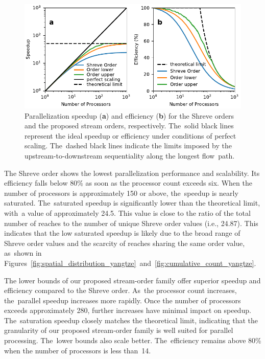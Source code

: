 \documentclass[water,article,accept,pdftex,moreauthors]{Definitions/mdpi}
\begin{document}
\vspace{-6pt}
\begin{figure}[H]
    \includegraphics[width=13.5cm]{fig/speedup_yangtze.pdf}
    \caption{Parallelization speedup (\textbf{a}) and efficiency (\textbf{b}) for the Shreve orders and the proposed stream orders, respectively. The~solid black lines represent the ideal speedup or efficiency under conditions of perfect scaling. The~dashed black lines indicate the limits imposed by the upstream-to-downstream sequentiality along the longest flow~path. \label{fig:scalability_yangtze}}
\end{figure}

The Shreve order shows the lowest parallelization performance and scalability. Its efficiency falls below 80\% as soon as the processor count exceeds six. When the number of processors is approximately 150 or above, the~speedup is nearly saturated. The~saturated speedup is significantly lower than the theoretical limit, with~a value of approximately 24.5. This value is close to the ratio of the total number of reaches to the number of unique Shreve order values (i.e., 24.87). This indicates that the low saturated speedup is likely due to the broad range of Shreve order values and the scarcity of reaches sharing the same order value, as~shown in Figures~\ref{fig:spatial_distribution_yangtze}~and~\ref{fig:cumulative_count_yangtze}.

The lower bounds of our proposed stream-order family offer superior speedup and efficiency compared to the Shreve order. As~the processor count increases, the~parallel speedup increases more rapidly. Once the number of processors exceeds approximately 280, further increases have minimal impact on speedup. The~saturation speedup closely matches the theoretical limit, indicating that the granularity of our proposed stream-order family is well suited for parallel processing. The~lower bounds also scale better. The~efficiency remains above 80\% when the number of processors is less than~14.
\end{document}
